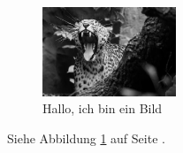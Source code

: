 \documentclass[12pt,ngerman]{scrartcl}
\begin{document}
\listoffigures

\begin{figure}[b]
\begin{center}
\includegraphics[width=4cm]{hallowelt.jpg}
\caption{Hallo, ich bin ein Bild}\label{fig:hallo}
\end{center}
\end{figure}

Siehe Abbildung \ref{fig:hallo} auf Seite \pageref{fig:hallo}.
\end{document}
